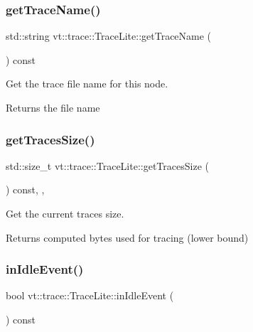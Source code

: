 \subsubsection{\texorpdfstring{get\+Trace\+Name()}{getTraceName()}}
{\footnotesize\ttfamily std\+::string vt\+::trace\+::\+Trace\+Lite\+::get\+Trace\+Name (\begin{DoxyParamCaption}{ }\end{DoxyParamCaption}) const\hspace{0.3cm}{\ttfamily [inline]}}



Get the trace file name for this node. 

\begin{DoxyReturn}{Returns}
the file name 
\end{DoxyReturn}
\mbox{\label{structvt_1_1trace_1_1_trace_lite_a41527439099e35c51d539201238dbe96}} 
\subsubsection{\texorpdfstring{get\+Traces\+Size()}{getTracesSize()}}
{\footnotesize\ttfamily std\+::size\+\_\+t vt\+::trace\+::\+Trace\+Lite\+::get\+Traces\+Size (\begin{DoxyParamCaption}{ }\end{DoxyParamCaption}) const\hspace{0.3cm}{\ttfamily [inline]}, {\ttfamily [protected]}, {\ttfamily [noexcept]}}



Get the current traces size. 

\begin{DoxyReturn}{Returns}
computed bytes used for tracing (lower bound) 
\end{DoxyReturn}
\mbox{\label{structvt_1_1trace_1_1_trace_lite_ad3b81920d008e46dff0eb205ca99bd22}} 
\subsubsection{\texorpdfstring{in\+Idle\+Event()}{inIdleEvent()}}
{\footnotesize\ttfamily bool vt\+::trace\+::\+Trace\+Lite\+::in\+Idle\+Event (\begin{DoxyParamCaption}{ }\end{DoxyParamCaption}) const}



